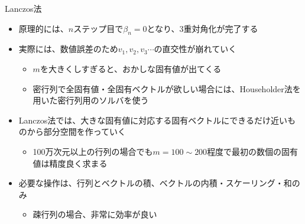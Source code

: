 \begin{frame}[t,fragile]{Lanczos法}
  \begin{itemize}
  \item 原理的には、$n$ステップ目で$\beta_n=0$となり、3重対角化が完了する
  \item 実際には、数値誤差のため$v_1,v_2,v_3\cdots$の直交性が崩れていく
    \begin{itemize}
      \item $m$を大きくしすぎると、おかしな固有値が出てくる
      \item 密行列で全固有値・全固有ベクトルが欲しい場合には、Householder法を用いた密行列用のソルバを使う
    \end{itemize}
  \item Lanczos法では、大きな固有値に対応する固有ベクトルにできるだけ近いものから部分空間を作っていく
    \begin{itemize}
      \item 100万次元以上の行列の場合でも$m=100 \sim 200$程度で最初の数個の固有値は精度良く求まる
    \end{itemize}
  \item 必要な操作は、行列とベクトルの積、ベクトルの内積・スケーリング・和のみ
    \begin{itemize}
      \item 疎行列の場合、非常に効率が良い
    \end{itemize}
  \end{itemize}
\end{frame}
